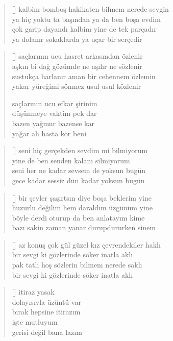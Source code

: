 \documentclass[a5paper, openright, twoside]{memoir}
\begin{document}
\begin{verse}[\versewidth]
  kalbim bomboş hakikaten bilmem nerede sevgin \\
  ya hiç yoktu ta başından ya da ben boşa evdim \\
  çok garip dayandı kalbim yine de tek parçadır \\
  ya dolanır sokaklarda ya uçar bir serçedir \\
\end{verse}
\begin{verse}[\versewidth]
  saçlarının ucu hasret arkasından özlenir \\
  aşkın bi dağ gözümde ne aşılır ne sözlenir \\
  sustukça harlanır aman bir cehennem özlemin \\
  yakar yüreğimi sönmez usul usul közlenir

  saçlarının ucu efkar şirinim \\
  düşünmeye vaktim pek dar \\
  bazen yağmur bazense kar \\
  yağar ah hasta kor beni \\
\end{verse}
\begin{verse}[\versewidth]
  seni hiç gerçekden sevdim mi bilmiyorum \\
  yine de ben senden kalanı silmiyorum \\
  seni her ne kadar sevsem de yoksun bugün \\
  gece kadar sessiz dün kadar yoksun bugün \\
\end{verse}
\begin{verse}[\versewidth]
  bir şeyler şaşırtsın diye boşa beklerim yine \\
  huzurlu değilim hem daraldım üzgünüm yine \\
  böyle derdi oturup da ben anlatayım kime \\
  bazı sakin zaman yanar durupdururken sinem \\
\end{verse}
\begin{verse}[\versewidth]
  az konuş çok gül güzel kız çevrendekiler haklı \\
  bir sevgi ki gözlerinde söker inatla aklı \\
  pak tatlı hoş sözlerin bilmem nerede saklı \\
  bir sevgi ki gözlerinde söker inatla aklı \\
\end{verse}
\begin{verse}[\versewidth]
  itiraz yasak \\
  dolayısıyla üzüntü var \\
  bırak hepsine itirazım \\
  işte mutluyum \\
  gerisi değil bana lazım \\
\end{verse}
\end{document}
